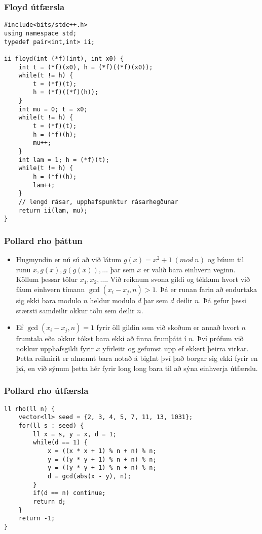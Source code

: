 \documentclass{beamer}
\begin{document}
\begin{frame}[fragile]
\frametitle{Floyd útfærsla}

\begin{tiny}
\begin{verbatim}
#include<bits/stdc++.h>
using namespace std;
typedef pair<int,int> ii;

ii floyd(int (*f)(int), int x0) {
    int t = (*f)(x0), h = (*f)((*f)(x0));
    while(t != h) {
        t = (*f)(t); 
        h = (*f)((*f)(h));
    }
    int mu = 0; t = x0;
    while(t != h) {
        t = (*f)(t);
        h = (*f)(h);
        mu++;
    }
    int lam = 1; h = (*f)(t);
    while(t != h) {
        h = (*f)(h);
        lam++;
    }
    // lengd rásar, upphafspunktur rásarhegðunar
    return ii(lam, mu);
}

\end{verbatim}
\end{tiny}

\end{frame}

\begin{frame}
\frametitle{Pollard rho þáttun}

\begin{itemize}

\item<1-> Hugmyndin er nú sú að við látum $g(x) = x^2 + 1 \ (mod \ n)$ og búum til runu $x, g(x), g(g(x)), \dots$ þar sem $x$ er valið bara einhvern veginn. Köllum þessar tölur $x_1,x_2,\dots$. Við reiknum svona gildi og tékkum hvort við fáum einhvern tímann $\operatorname{gcd}(x_i - x_j, n) > 1$. Þá er runan farin að endurtaka sig ekki bara modulo $n$ heldur modulo $d$ þar sem $d$ deilir $n$. Þá gefur þessi stærsti samdeilir okkur tölu sem deilir $n$.

\item<2-> Ef $\operatorname{gcd}(x_i - x_j, n) = 1$ fyrir öll gildin sem við skoðum er annað hvort $n$ frumtala eða okkur tókst bara ekki að finna frumþátt í $n$. Því prófum við nokkur upphafsgildi fyrir $x$ yfirleitt og gefumst upp ef ekkert þeirra virkar. Þetta reiknirit er almennt bara notað á bigInt því það borgar sig ekki fyrir en þá, en við sýnum þetta hér fyrir long long bara til að sýna einhverja útfærslu.

\end{itemize}

\end{frame}

\begin{frame}[fragile]
\frametitle{Pollard rho útfærsla}

\begin{verbatim}
ll rho(ll n) {
    vector<ll> seed = {2, 3, 4, 5, 7, 11, 13, 1031};
    for(ll s : seed) {
        ll x = s, y = x, d = 1;
        while(d == 1) {
            x = ((x * x + 1) % n + n) % n;
            y = ((y * y + 1) % n + n) % n;
            y = ((y * y + 1) % n + n) % n;
            d = gcd(abs(x - y), n);
        }
        if(d == n) continue;
        return d;
    }
    return -1;
}
\end{verbatim}

\end{frame}
\end{document}

